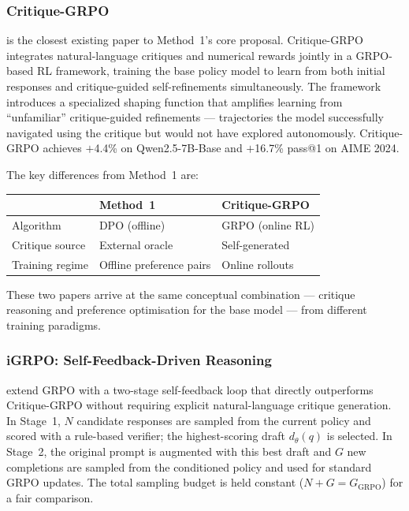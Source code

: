 \subsubsection{Critique-GRPO}

\autocite{zhang2025critiquegrpoadvancingllm} is the closest existing paper to Method~1's core proposal. Critique-GRPO integrates natural-language critiques and numerical rewards jointly in a GRPO-based RL framework, training the base policy model to learn from both initial responses and critique-guided self-refinements simultaneously. The framework introduces a specialized shaping function that amplifies learning from ``unfamiliar'' critique-guided refinements --- trajectories the model successfully navigated using the critique but would not have explored autonomously. Critique-GRPO achieves $+$4.4\% on Qwen2.5-7B-Base and $+$16.7\% pass@1 on AIME 2024.

The key differences from Method~1 are:

\begin{center}
    \begin{tabular}{lll}
        \hline
                        & \textbf{Method~1}        & \textbf{Critique-GRPO} \\
        \hline
        Algorithm       & DPO (offline)            & GRPO (online RL)       \\
        Critique source & External oracle          & Self-generated         \\
        Training regime & Offline preference pairs & Online rollouts        \\
        \hline
    \end{tabular}
\end{center}

These two papers arrive at the same conceptual combination --- critique reasoning and preference optimisation for the base model --- from different training paradigms.

\subsubsection{iGRPO: Self-Feedback-Driven Reasoning}

\autocite{hatamizadeh2026igrpo} extend GRPO with a two-stage self-feedback loop that directly outperforms Critique-GRPO without requiring explicit natural-language critique generation. In Stage~1, $N$ candidate responses are sampled from the current policy and scored with a rule-based verifier; the highest-scoring draft $d_\theta(q)$ is selected. In Stage~2, the original prompt is augmented with this best draft and $G$ new completions are sampled from the conditioned policy and used for standard GRPO updates. The total sampling budget is held constant ($N + G = G_{\mathrm{GRPO}}$) for a fair comparison.

